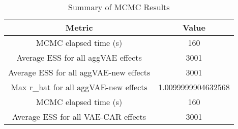 
\begin{table}[h!]
\centering
\begin{tabular}{|c|c|}
\hline
\textbf{Metric} & \textbf{Value} \\
\hline
MCMC elapsed time (s) & 160 \\
\hline
Average ESS for all aggVAE effects & 3001 \\
\hline
Average ESS for all aggVAE-new effects & 3001 \\
\hline
Max r\_hat for all aggVAE-new effects & 1.0099999904632568 \\
\hline
MCMC elapsed time (s) & 160 \\
\hline
Average ESS for all VAE-CAR effects & 3001 \\
\hline
\end{tabular}
\caption{Summary of MCMC Results}
\label{table:mcmc_summary}
\end{table}

